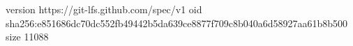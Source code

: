version https://git-lfs.github.com/spec/v1
oid sha256:e851686dc70dc552fb49442b5da639ce8877f709c8b040a6d58927aa61b8b500
size 11088
